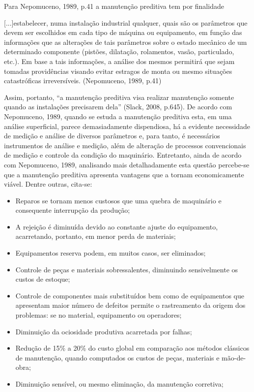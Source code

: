 \documentclass[
	12pt,				
	oneside,			
	a4paper,			
	english,			
	brazil				
	]{abntex2ppgsi}
\begin{document}
Para Nepomuceno, 1989, p.41 a manutenção preditiva tem por finalidade 

\begin{citacao}

[...]estabelecer, numa instalação industrial qualquer, quais são os parâmetros que devem ser escolhidos em cada tipo de máquina ou equipamento, em função das informações que as alterações de tais parâmetros sobre o estado mecânico de um determinado componente (pistões, dilatação, rolamentos, vasão, particulado, etc.). Em base a tais informações, a análise dos mesmos permitirá que sejam tomadas providências visando evitar estragos de monta ou mesmo situações catastróficas irreversíveis. (Nepomuceno, 1989, p.41)

\end{citacao}

Assim, portanto, “a manutenção preditiva visa realizar manutenção somente quando as instalações precisarem dela” (Slack, 2008, p.645). 
De acordo com Nepomuceno, 1989, quando se estuda a manutenção preditiva esta, em uma análise superficial, parece demasiadamente dispendiosa, há a evidente necessidade de medição e análise de diversos parâmetros e, para tanto, é necessários instrumentos de análise e medição, além de alteração de processos convencionais de medição e controle da condição do maquinário. Entretanto, ainda de acordo com Nepomuceno, 1989, analisando mais detalhadamente esta questão percebe-se que a manutenção preditiva apresenta vantagens que a tornam economicamente viável. Dentre outras, cita-se: 


\begin{itemize}
	\item Reparos se tornam menos custosos que uma quebra de maquinário e consequente interrupção da produção;
	\item A rejeição é diminuída devido ao constante ajuste do equipamento, acarretando, portanto, em menor perda de materiais;
	\item Equipamentos reserva podem, em muitos casos, ser eliminados;
	\item Controle de peças e materiais sobressalentes, diminuindo sensivelmente os custos de estoque;
	\item Controle de componentes mais substituídos bem como de equipamentos que apresentam maior número de defeitos permite o rastreamento da origem dos problemas: se no material, equipamento ou operadores;
	\item Diminuição da ociosidade produtiva acarretada por falhas;
	\item Redução de 15\% a 20\% do custo global em comparação aos métodos clássicos de manutenção, quando computados os custos de peças, materiais e mão-de-obra;
	\item Diminuição sensível, ou mesmo eliminação, da manutenção corretiva;
\end{itemize}
\end{document}
